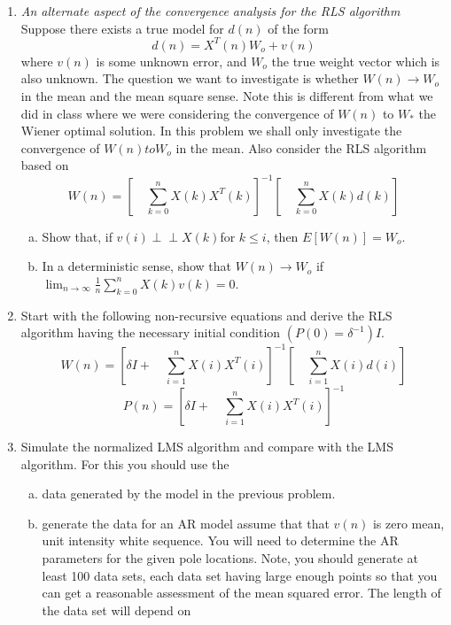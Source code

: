 \documentclass[journal,12pt,twocolumn]{IEEEtran}
\begin{document}
\section{}
\begin{enumerate}
\item \textit{An alternate aspect of the convergence analysis for the RLS algorithm}
Suppose there exists a true model for $d(n)$ of the form
$$d(n)=X^T(n)W_o+v(n)$$
where $v(n)$ is some unknown error, and $W_o$ the true weight vector which is also unknown.
%
The question we want to investigate is whether $W(n)\rightarrow {W}_o$ in the mean and the mean square sense. Note this is different from what we did in class where we were considering the convergence of $W(n)$ to $W_*$ the Wiener optimal
solution.
%
In this problem we shall only investigate the convergence of $W(n) to W_o$ in the mean. Also consider the RLS
algorithm based on
$$W(n)=[\quad\sum_{k=0}^{n}X(k)X^T(k)]^{-1}[\quad\sum_{k=0}^{n}X(k)d(k)]$$
\begin{enumerate}[(a)]
\item Show that, if ${v(i)}\perp\!\!\!\perp{X(k)}$for $k \leq i$, then $E[W(n)] = W_{o}.$
%
\item In a deterministic sense, show that $W(n)\rightarrow W_o$ if $\lim_{n\to\infty}\frac{1}{n}\sum_{k=0}^{n}X(k)v(k)=0.$
\end{enumerate}
\item Start with the following non-recursive equations and derive the RLS algorithm having the necessary initial condition $(P(0)=\delta^{-1})I.$
$$W(n)=[\delta I+\quad\sum_{i=1}^{n}X(i) X^T(i)]^{-1}[\quad\sum_{i=1}^{n}X(i)d(i)]$$
$$P(n)=[\delta I+\quad\sum_{i=1}^{n}X(i)X^T(i)]^{-1}$$
\item Simulate the normalized LMS algorithm and compare with the LMS algorithm. For this you should use the 
\begin{enumerate}[(a)]
\item data generated by the model in the previous problem.
\item generate the data for an AR model
assume that that $v(n)$ is zero mean, unit intensity white sequence. You will need to determine the AR parameters for
the given pole locations. Note, you should generate at least 100 data sets, each data set having large enough points
so that you can get a reasonable assessment of the mean squared error. The length of the data set will depend on

\end{enumerate}
\end{enumerate}
\end{document}
